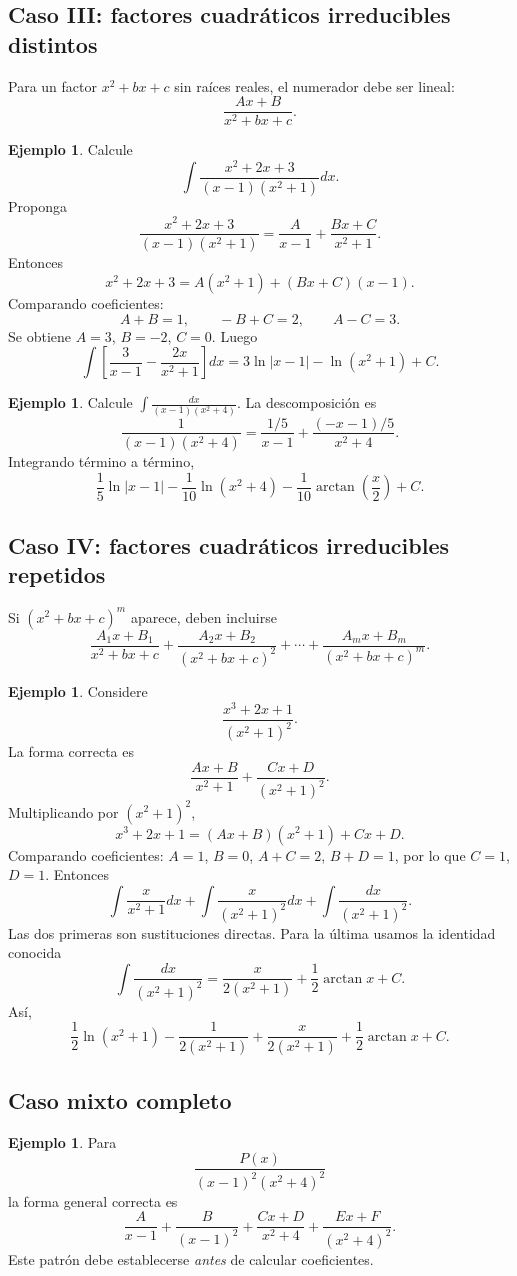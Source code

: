 \documentclass[12pt]{article}
\theoremstyle{definition}\newtheorem{definicion}[teorema]{Definición}\newtheorem{ejemplo}[teorema]{Ejemplo}\newtheorem{ejercicio}[teorema]{Ejercicio}
\theoremstyle{remark}\newtheorem*{observacion}{Observación}\newtheorem*{advertencia}{Advertencia}\newtheorem*{estrategia}{Estrategia}
\begin{document}
\subsection{Caso III: factores cuadráticos irreducibles distintos}
Para un factor $x^2+bx+c$ sin raíces reales, el numerador debe ser lineal:
\[\frac{Ax+B}{x^2+bx+c}.\]
\begin{ejemplo}Calcule
\[\int\frac{x^2+2x+3}{(x-1)(x^2+1)}dx.\]
Proponga
\[\frac{x^2+2x+3}{(x-1)(x^2+1)}=\frac{A}{x-1}+\frac{Bx+C}{x^2+1}.\]
Entonces
\[x^2+2x+3=A(x^2+1)+(Bx+C)(x-1).\]
Comparando coeficientes:
\[A+B=1,\qquad -B+C=2,\qquad A-C=3.\]
Se obtiene $A=3$, $B=-2$, $C=0$. Luego
\[\int\left[\frac3{x-1}-\frac{2x}{x^2+1}\right]dx
=\boxed{3\ln|x-1|-\ln(x^2+1)+C}.\]\end{ejemplo}
\begin{ejemplo}Calcule $\int\frac{dx}{(x-1)(x^2+4)}$. La descomposición es
\[\frac1{(x-1)(x^2+4)}=\frac{1/5}{x-1}+\frac{(-x-1)/5}{x^2+4}.\]
Integrando término a término,
\[\boxed{\frac15\ln|x-1|-\frac1{10}\ln(x^2+4)-\frac1{10}\arctan\left(\frac{x}{2}\right)+C}.\]\end{ejemplo}

\subsection{Caso IV: factores cuadráticos irreducibles repetidos}
Si $(x^2+bx+c)^m$ aparece, deben incluirse
\[\frac{A_1x+B_1}{x^2+bx+c}+\frac{A_2x+B_2}{(x^2+bx+c)^2}+\cdots+\frac{A_mx+B_m}{(x^2+bx+c)^m}.\]
\begin{ejemplo}Considere
\[\frac{x^3+2x+1}{(x^2+1)^2}.\]
La forma correcta es
\[\frac{Ax+B}{x^2+1}+\frac{Cx+D}{(x^2+1)^2}.\]
Multiplicando por $(x^2+1)^2$,
\[x^3+2x+1=(Ax+B)(x^2+1)+Cx+D.\]
Comparando coeficientes: $A=1$, $B=0$, $A+C=2$, $B+D=1$, por lo que $C=1$, $D=1$. Entonces
\[\int\frac{x}{x^2+1}dx+\int\frac{x}{(x^2+1)^2}dx+\int\frac{dx}{(x^2+1)^2}.\]
Las dos primeras son sustituciones directas. Para la última usamos la identidad conocida
\[\int\frac{dx}{(x^2+1)^2}=\frac{x}{2(x^2+1)}+\frac12\arctan x+C.\]
Así,
\[\boxed{\frac12\ln(x^2+1)-\frac1{2(x^2+1)}+\frac{x}{2(x^2+1)}+\frac12\arctan x+C}.\]\end{ejemplo}

\subsection{Caso mixto completo}
\begin{ejemplo}Para
\[\frac{P(x)}{(x-1)^2(x^2+4)^2}\]
la forma general correcta es
\[\frac{A}{x-1}+\frac{B}{(x-1)^2}+\frac{Cx+D}{x^2+4}+\frac{Ex+F}{(x^2+4)^2}.\]
Este patrón debe establecerse \emph{antes} de calcular coeficientes.\end{ejemplo}
\end{document}
